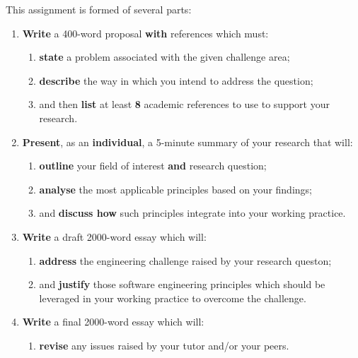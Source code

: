\documentclass{../../fal_assignment}
\begin{document}
This assignment is formed of several parts:

\begin{enumerate}[label=(\Alph*)]
    \item \textbf{Write} a 400-word proposal \textbf{with} references which must:
    	\begin{enumerate}[label=\roman*.]
    		\item \textbf{state} a problem associated with the given challenge area;
    		\item \textbf{describe} the way in which you intend to address the question;
    		\item and then \textbf{list} at least \textbf{8} academic references to use to support your research.
	\end{enumerate}
    \item \textbf{Present}, as an \textbf{individual}, a 5-minute summary of your research that will:
    	\begin{enumerate}[label=\roman*.]
    		\item \textbf{outline} your field of interest \textbf{and} research question;
    		\item \textbf{analyse} the most applicable principles based on your findings;
    		\item and \textbf{discuss how} such principles integrate into your working practice.
	\end{enumerate}
    \item \textbf{Write} a draft 2000-word essay which will:
    	\begin{enumerate}[label=\roman*.]
    		\item  \textbf{address} the engineering challenge raised by your research queston;
    		\item and \textbf{justify} those software engineering principles which should be leveraged in your working practice to overcome the challenge.
	\end{enumerate}
    \item \textbf{Write} a final 2000-word essay which will:
    	\begin{enumerate}[label=\roman*.]
    		\item \textbf{revise} any issues raised by your tutor and/or your peers.
	\end{enumerate}
\end{enumerate}

\end{document}

